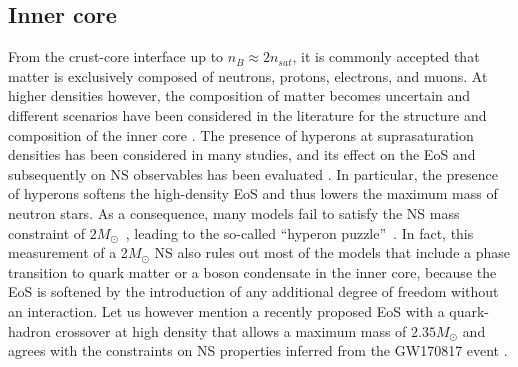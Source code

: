\subsection{Inner core}\label{subsec:icore}

From the crust-core interface up to $n_B \approx 2n_{sat}$, it is commonly
accepted that matter is exclusively composed of neutrons, protons, electrons, 
and muons. At higher densities however, the composition of matter becomes
uncertain and different scenarios have been considered in the
literature for the structure and composition of the inner 
core \cite{Oertel2017}. The presence of hyperons at suprasaturation densities 
has been considered in many studies, and its effect on the EoS and 
subsequently on NS observables has been 
evaluated \cite{Bednarek2012,Fortin2015}. In particular, the 
presence of hyperons softens the high-density EoS and thus lowers the maximum 
mass of neutron stars. As a consequence, many models fail to satisfy the NS 
mass constraint of $2M_\odot$~\cite{Antoniadis2013}, leading to the so-called
``hyperon puzzle''~\cite{Zdunik2013}. In fact, this measurement of a 2$M_\odot$ 
NS also rules out most of the models that include a phase transition to quark 
matter or a boson condensate in the inner core, because the EoS is softened
by the introduction of any additional degree of freedom without an 
interaction. Let us however mention a recently proposed EoS with a 
quark-hadron crossover at high density that allows a maximum mass of 
$2.35M_\odot$ \cite{Baym2019} and agrees with the constraints on NS
properties inferred from the GW170817 event \cite{GW1,GW2}.

